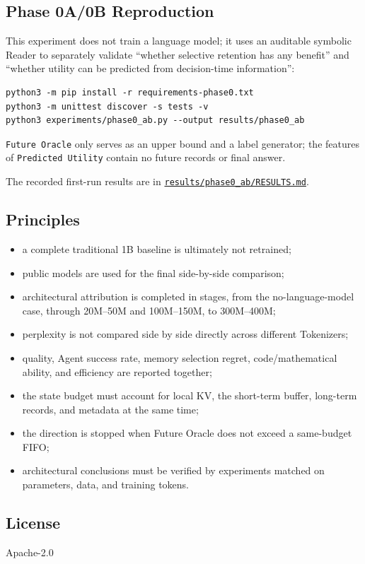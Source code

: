\subsection{Phase 0A/0B Reproduction}

This experiment does not train a language model; it uses an auditable symbolic Reader to separately validate ``whether selective retention has any benefit'' and ``whether utility can be predicted from decision-time information'':

\begin{lstlisting}[style=notes]
python3 -m pip install -r requirements-phase0.txt
python3 -m unittest discover -s tests -v
python3 experiments/phase0_ab.py --output results/phase0_ab
\end{lstlisting}

\texttt{Future Oracle} only serves as an upper bound and a label generator; the features of \texttt{Predicted Utility} contain no future records or final answer.

The recorded first-run results are in \href{results/phase0_ab/RESULTS.md}{\texttt{results/phase0\_ab/RESULTS.md}}.

\subsection{Principles}

\begin{itemize}
  \item a complete traditional 1B baseline is ultimately not retrained;
  \item public models are used for the final side-by-side comparison;
  \item architectural attribution is completed in stages, from the no-language-model case, through 20M--50M and 100M--150M, to 300M--400M;
  \item perplexity is not compared side by side directly across different Tokenizers;
  \item quality, Agent success rate, memory selection regret, code/mathematical ability, and efficiency are reported together;
  \item the state budget must account for local KV, the short-term buffer, long-term records, and metadata at the same time;
  \item the direction is stopped when Future Oracle does not exceed a same-budget FIFO;
  \item architectural conclusions must be verified by experiments matched on parameters, data, and training tokens.
\end{itemize}

\subsection{License}

Apache-2.0
